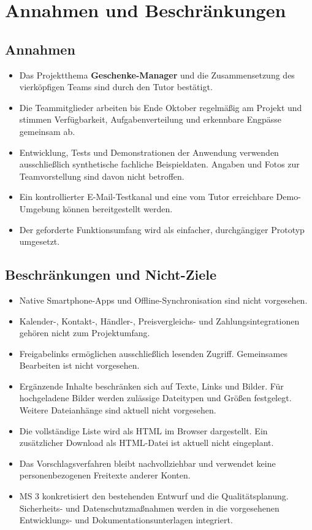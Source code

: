 \documentclass[11pt,a4paper]{article}
\begin{document}
\section{Annahmen und Beschränkungen}

\subsection{Annahmen}

\begin{itemize}
\item Das Projektthema \textbf{Geschenke-Manager} und die Zusammensetzung des vierköpfigen Teams sind durch den Tutor bestätigt.
\item Die Teammitglieder arbeiten bis Ende Oktober regelmäßig am Projekt und stimmen Verfügbarkeit, Aufgabenverteilung und erkennbare Engpässe gemeinsam ab.
\item Entwicklung, Tests und Demonstrationen der Anwendung verwenden ausschließlich synthetische fachliche Beispieldaten. Angaben und Fotos zur Teamvorstellung sind davon nicht betroffen.
\item Ein kontrollierter E-Mail-Testkanal und eine vom Tutor erreichbare Demo-Umgebung können bereitgestellt werden.
\item Der geforderte Funktionsumfang wird als einfacher, durchgängiger Prototyp umgesetzt.
\end{itemize}

\subsection{Beschränkungen und Nicht-Ziele}

\begin{itemize}
\item Native Smartphone-Apps und Offline-Synchronisation sind nicht vorgesehen.
\item Kalender-, Kontakt-, Händler-, Preisvergleichs- und Zahlungsintegrationen gehören nicht zum Projektumfang.
\item Freigabelinks ermöglichen ausschließlich lesenden Zugriff. Gemeinsames Bearbeiten ist nicht vorgesehen.
\item Ergänzende Inhalte beschränken sich auf Texte, Links und Bilder. Für hochgeladene Bilder werden zulässige Dateitypen und Größen festgelegt. Weitere Dateianhänge sind aktuell nicht vorgesehen.
\item Die vollständige Liste wird als HTML im Browser dargestellt. Ein zusätzlicher Download als HTML-Datei ist aktuell nicht eingeplant.
\item Das Vorschlagsverfahren bleibt nachvollziehbar und verwendet keine personenbezogenen Freitexte anderer Konten.
\item MS 3 konkretisiert den bestehenden Entwurf und die Qualitätsplanung. Sicherheits- und Datenschutzmaßnahmen werden in die vorgesehenen Entwicklungs- und Dokumentationsunterlagen integriert.
\end{itemize}
\end{document}

